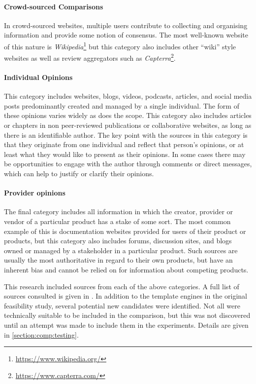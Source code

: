 \paragraph{Crowd-sourced Comparisons} In crowd-sourced websites, multiple users contribute to collecting and organising information and provide some notion of consensus. The most well-known website of this nature is \emph{Wikipedia}\footnote{\url{https://www.wikipedia.org/}} but this category also includes other \enquote{wiki} style websites as well as review aggregators such as \emph{Capterra}\footnote{\url{https://www.capterra.com/}}.
    
\paragraph{Individual Opinions} This category includes websites, blogs, videos, podcasts, articles, and social media posts predominantly created and managed by a single individual. The form of these opinions varies widely as does the scope. This category also includes articles or chapters in non peer-reviewed publications or collaborative websites, as long as there is an identifiable author. The key point with the sources in this category is that they originate from one individual and reflect that person's opinions, or at least what they would like to present as their opinions. In some cases there may be opportunities to engage with the author through comments or direct messages, which can help to justify or clarify their opinions.
    
\paragraph{Provider opinions} The final category includes all information in which the creator, provider or vendor of a particular product has a stake of some sort. The most common example of this is documentation websites provided for users of their product or products, but this category also includes forums, discussion sites, and blogs owned or managed by a stakeholder in a particular product. Such sources are usually the most authoritative in regard to their own products, but have an inherent bias and cannot be relied on for information about competing products.

This research included sources from each of the above categories. A full list of sources consulted is given in . In addition to the \gls{template engine}s in the original feasibility study, several potential new candidates were identified. Not all were technically suitable to be included in the comparison, but this was not discovered until an attempt was made to include them in the experiments. Details are given in \autoref{section:comp:testing}.

